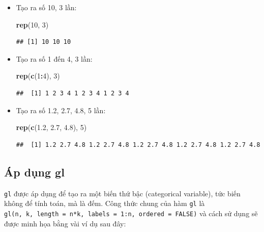 \documentclass[
]{book}
\newenvironment{Shaded}{\begin{snugshade}}{\end{snugshade}}
\newcommand{\DecValTok}[1]{\textcolor[rgb]{0.00,0.00,0.81}{#1}}
\newcommand{\FloatTok}[1]{\textcolor[rgb]{0.00,0.00,0.81}{#1}}
\newcommand{\KeywordTok}[1]{\textcolor[rgb]{0.13,0.29,0.53}{\textbf{#1}}}
\newcommand{\NormalTok}[1]{#1}
\newcommand{\OperatorTok}[1]{\textcolor[rgb]{0.81,0.36,0.00}{\textbf{#1}}}
\begin{document}
\begin{itemize}
\item
  Tạo ra số 10, 3 lần:

\begin{Shaded}
\begin{Highlighting}[]
\KeywordTok{rep}\NormalTok{(}\DecValTok{10}\NormalTok{, }\DecValTok{3}\NormalTok{)}
\end{Highlighting}
\end{Shaded}

\begin{verbatim}
## [1] 10 10 10
\end{verbatim}
\item
  Tạo ra số 1 đến 4, 3 lần:

\begin{Shaded}
\begin{Highlighting}[]
\KeywordTok{rep}\NormalTok{(}\KeywordTok{c}\NormalTok{(}\DecValTok{1}\OperatorTok{:}\DecValTok{4}\NormalTok{), }\DecValTok{3}\NormalTok{)}
\end{Highlighting}
\end{Shaded}

\begin{verbatim}
##  [1] 1 2 3 4 1 2 3 4 1 2 3 4
\end{verbatim}
\item
  Tạo ra số 1.2, 2.7, 4.8, 5 lần:

\begin{Shaded}
\begin{Highlighting}[]
\KeywordTok{rep}\NormalTok{(}\KeywordTok{c}\NormalTok{(}\FloatTok{1.2}\NormalTok{, }\FloatTok{2.7}\NormalTok{, }\FloatTok{4.8}\NormalTok{), }\DecValTok{5}\NormalTok{)}
\end{Highlighting}
\end{Shaded}

\begin{verbatim}
##  [1] 1.2 2.7 4.8 1.2 2.7 4.8 1.2 2.7 4.8 1.2 2.7 4.8 1.2 2.7 4.8
\end{verbatim}
\end{itemize}

\hypertarget{uxe1p-dux1ee5ng-gl}{%
\subsection*{Áp dụng gl}\label{uxe1p-dux1ee5ng-gl}}

\texttt{gl} được áp dụng để tạo ra một biến thứ bậc (categorical variable), tức biến không để tính toán, mà là đếm. Công thức chung của hàm \texttt{gl} là \texttt{gl(n,\ k,\ length\ =\ n*k,\ labels\ =\ 1:n,\ ordered\ =\ FALSE)} và cách sử dụng sẽ được minh họa bằng vài ví dụ sau đây:
\end{document}
